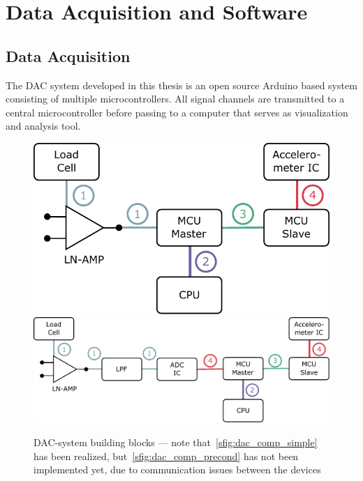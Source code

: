 \chapter{Data Acquisition and Software%
  \label{chap:\currfilebase}}

\section{Data Acquisition}

The \ac{DAC} system developed in this thesis is an open source Arduino based system consisting of multiple microcontrollers. All signal channels are transmitted to a central microcontroller before passing to a computer that serves as visualization and analysis tool.

\begin{figure}[!htb]
  \centering
    {\includegraphics[scale=0.5]{figures/dac/dac_components/dac_comp_simple}}
    \hfill
    {\includegraphics[scale=0.5]{figures/dac/dac_components/dac_comp_precond}}
  \\[0.5em]
  \caption[DAC building blocks]{\acs{DAC}-system building blocks --- note that~\ref{sfig:dac_comp_simple} has been realized, but~\ref{sfig:dac_comp_precond} has not been implemented yet, due to communication issues between the devices%
    \label{fig:dac_building_blocks}}
\end{figure}

